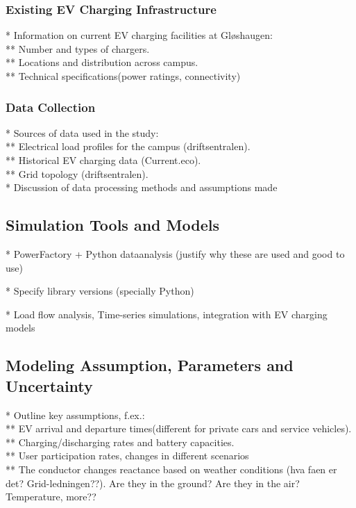 \subsubsection{Existing EV Charging Infrastructure}

* Information on current EV charging facilities at Gløshaugen: \\
** Number and types of chargers. \\
** Locations and distribution across campus. \\
** Technical specifications(power ratings, connectivity)


\subsubsection{Data Collection}

* Sources of data used in the study: \\
** Electrical load profiles for the campus (driftsentralen). \\
** Historical EV charging data (Current.eco). \\
** Grid topology (driftsentralen). \\

* Discussion of data processing methods and assumptions made


\subsection{Simulation Tools and Models}

* PowerFactory + Python dataanalysis (justify why these are used and good to use)

* Specify library versions (specially Python)

* Load flow analysis, Time-series simulations, integration with EV charging models


\subsection{Modeling Assumption, Parameters and Uncertainty}

* Outline key assumptions, f.ex.: \\
** EV arrival and departure times(different for private cars and service vehicles). \\
** Charging/discharging rates and battery capacities. \\
** User participation rates, changes in different scenarios \\
** The conductor changes reactance based on weather conditions (hva faen er det? Grid-ledningen??). Are they in the ground? Are they in the air? Temperature, more?? \\

